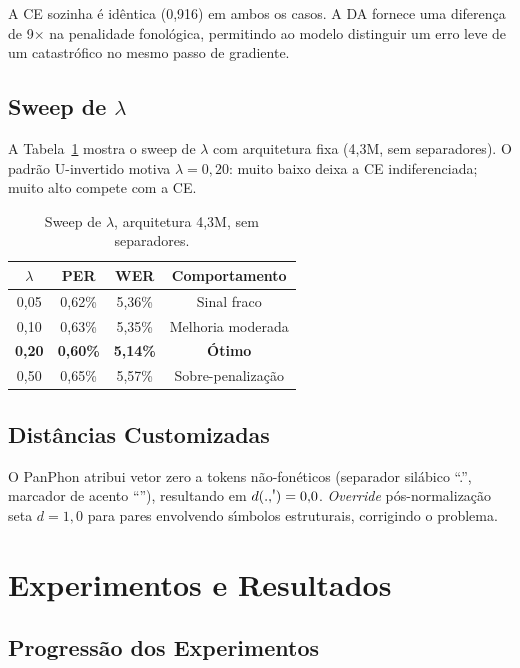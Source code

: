 \documentclass[12pt]{article}
\newcommand{\stressmark}{\raisebox{0.25ex}{\textquotesingle}}%
\begin{document}
A CE sozinha \'e id\^entica (0,916) em ambos os casos. A DA fornece
uma diferen\c{c}a de 9$\times$ na penalidade fonol\'ogica, permitindo
ao modelo distinguir um erro leve de um catastr\'ofico no mesmo passo
de gradiente.

\subsection{Sweep de $\lambda$}

A Tabela~\ref{tab:lambda} mostra o sweep de $\lambda$ com arquitetura
fixa (4,3M, sem separadores). O padr\~ao U-invertido motiva
$\lambda{=}0{,}20$: muito baixo deixa a CE indiferenciada; muito alto
compete com a CE.

\begin{table}[ht]
\centering
\caption{Sweep de $\lambda$, arquitetura 4,3M, sem separadores.}
\label{tab:lambda}
\begin{tabular}{cccc}
\toprule
$\lambda$ & PER & WER & Comportamento \\
\midrule
0,05 & 0,62\% & 5,36\% & Sinal fraco \\
0,10 & 0,63\% & 5,35\% & Melhoria moderada \\
\textbf{0,20} & \textbf{0,60\%} & \textbf{5,14\%} & \textbf{\'Otimo} \\
0,50 & 0,65\% & 5,57\% & Sobre-penaliza\c{c}\~ao \\
\bottomrule
\end{tabular}
\end{table}

\subsection{Dist\^ancias Customizadas}

O PanPhon atribui vetor zero a tokens n\~ao-fon\'eticos (separador
sil\'abico ``.'', marcador de acento ``\stressmark''), resultando em
$d(.{,}\text{\stressmark}) = 0{,}0$. \emph{Override}
p\'os-normaliza\c{c}\~ao seta $d{=}1{,}0$ para pares envolvendo
s\'{\i}mbolos estruturais, corrigindo o problema.

\section{Experimentos e Resultados}

\subsection{Progress\~ao dos Experimentos}
\end{document}
